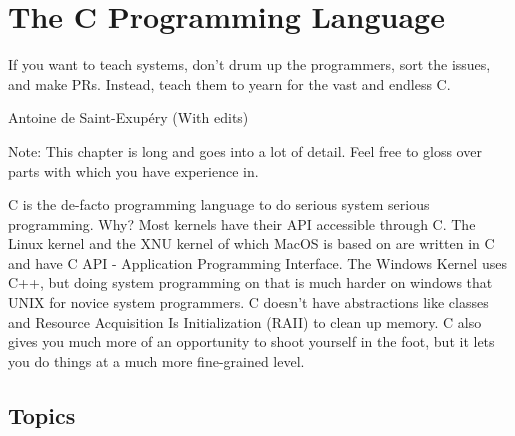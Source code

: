 \chapter{The C Programming Language}

\epigraph{If you want to teach systems, don't drum up the programmers, sort the issues, and make PRs. Instead, teach them to yearn for the vast and endless C.}{Antoine de Saint-Exup\'{e}ry (With edits)}

Note: This chapter is long and goes into a lot of detail. Feel free to gloss over parts with which you have experience in.

\gls{C} is the de-facto programming language to do serious system serious programming.
Why?
Most kernels have their \gls{API} accessible through C.
The \gls{Linux kernel} \cite{Love} and the XNU kernel \citet{xnukernel} of which \gls{MacOS} is based on are written in C and have C API - Application Programming Interface.
The \gls{Windows Kernel} uses C++, but doing system programming on that is much harder on windows that \gls{UNIX} for novice system programmers.
C doesn't have \gls{abstractions} like classes and \gls{Resource Acquisition Is Initialization} (RAII) to clean up memory.
C also gives you much more of an opportunity to shoot yourself in the foot, but it lets you do things at a much more fine-grained level.











\section{Topics}

